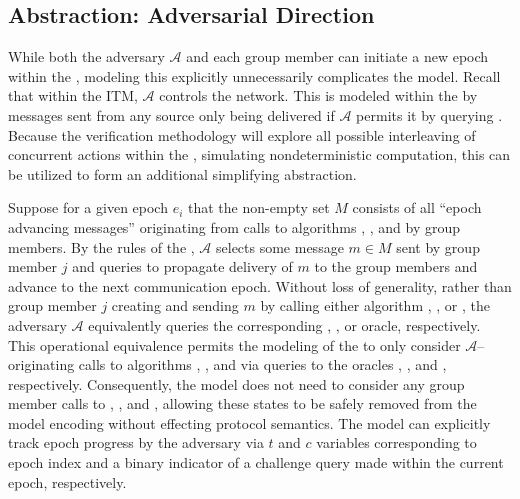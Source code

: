 \documentclass[runningheads]{llncs}
\newcommand{\Abrev}[1]{\gls{#1}}
\newcommand{\Adversary}{\ensuremath{\mathcal{A}}\xspace}
\begin{document}
\subsection{Abstraction: Adversarial Direction}
While both the adversary \Adversary and each group member can initiate a new epoch within the \CGKAsec, modeling this explicitly unnecessarily complicates the model.
Recall that within the \Abrev{ITM}, \Adversary controls the network.
This is modeled within the \CGKAsec by messages sent from any source only being delivered if \Adversary permits it by querying .
Because the verification methodology will explore all possible interleaving of concurrent actions within the \CGKAsec, simulating nondeterministic computation, this can be utilized to form an additional simplifying abstraction.

Suppose for a given epoch $e_i$ that the non-empty set $M$ consists of all ``epoch advancing messages'' originating from calls to algorithms , , and  by group members.
By the rules of the \CGKAsec, \Adversary selects some message $m \in M$ sent by group member $j$ and queries  to propagate delivery of $m$ to the group members and advance to the next communication epoch.
Without loss of generality, rather than group member $j$ creating and sending $m$ by calling either algorithm , , or , the adversary \Adversary equivalently queries the corresponding , , or  oracle, respectively.
This operational equivalence permits the modeling of the \CGKAsec to only consider \Adversary--originating calls to algorithms , , and  via queries to the oracles , , and , respectively.
Consequently, the model does not need to consider any group member calls to , , and , allowing these states to be safely removed from the model encoding without effecting protocol semantics.
The model can explicitly track epoch progress by the adversary via $t$ and $c$ variables corresponding to epoch index and a binary indicator of a challenge query made within the current epoch, respectively.
\end{document}

